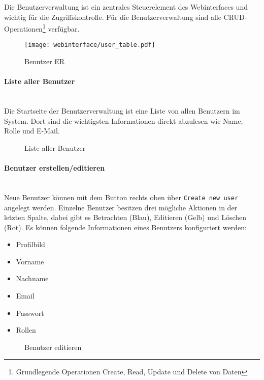 Die Benutzerverwaltung ist ein zentrales Steuerelement des Webinterfaces und wichtig
für die Zugriffskontrolle. Für die Benutzerverwaltung sind alle
CRUD-Operationen\footnote{Grundlegende Operationen Create, Read, Update und
Delete von Daten} verfügbar.

\begin{figure}[H]
  \centering
  \texttt{[image: webinterface/user\_table.pdf]}
  \caption{Benutzer ER}
\end{figure}

\paragraph{Liste aller Benutzer}\mbox{}\\

Die Startseite der Benutzerverwaltung ist eine Liste von allen Benutzern im
System. Dort sind die wichtigsten Informationen direkt abzulesen wie Name, Rolle
und E-Mail.

\begin{figure}[H]
  \centering
  \caption{Liste aller Benutzer}
\end{figure}

\paragraph{Benutzer erstellen/editieren}\mbox{}\\

Neue Benutzer können mit dem Button rechts oben über \verb|Create new user| angelegt
werden. Einzelne Benutzer besitzen drei mögliche Aktionen in der letzten Spalte,
dabei gibt es Betrachten (Blau), Editieren (Gelb) und Löschen (Rot). Es können
folgende Informationen eines Benutzers konfiguriert werden:

\begin{itemize}
  \item Profilbild
  \item Vorname
  \item Nachname
  \item Email
  \item Passwort
  \item Rollen
\end{itemize}

\begin{figure}[H]
  \centering
  \caption{Benutzer editieren}
\end{figure}

